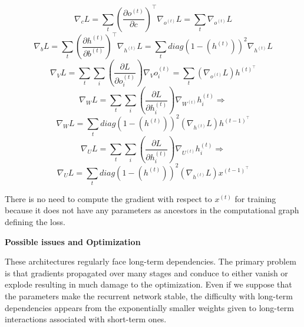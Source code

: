 \begin{equation}
    \nabla_c L = \sum_t (\frac{\partial o^{(t)}}{\partial c})^\top \nabla_{o^{(t)}} L = \sum_t \nabla_{o^{(t)}} L\label{eq:equation15}
\end{equation}
\begin{equation}
    \nabla_b L = \sum_t (\frac{\partial h^{(t)}}{\partial b^{(t)}})^\top \nabla_{h^{(t)}} L = \sum_t diag(1-(h^{(t)}))^2 \nabla_{h^{(t)}} L\label{eq:equation16}
\end{equation}
\begin{equation}
    \nabla_V L = \sum_t \sum_i (\frac{\partial L}{\partial o^{(t)}_i}) \nabla_V o^{(t)}_i = \sum_t (\nabla_{o^{(t)}} L) h^{(t)^\top}\label{eq:equation17}
\end{equation}
\begin{equation}
    \nabla_W L = \sum_t \sum_i (\frac{\partial L}{\partial h^{(t)}_i}) \nabla_{W^{(t)}} h^{(t)}_i \Rightarrow\label{eq:equation18}
\end{equation}
\begin{equation}
    \nabla_W L = \sum_t diag(1-(h^{(t)}))^2 (\nabla_{h^{(t)}} L) h^{(t-1)^\top}\label{eq:equation19}
\end{equation}
\begin{equation}
    \nabla_U L = \sum_t \sum_i (\frac{\partial L}{\partial h^{(t)}_i}) \nabla_{U^{(t)}} h^{(t)}_i \Rightarrow\label{eq:equation20}
\end{equation}
\begin{equation}
    \nabla_U L = \sum_t diag(1-(h^{(t)}))^2 (\nabla_{h^{(t)}} L) x^{(t-1)^\top}\label{eq:equation21}
\end{equation}

There is no need to compute the gradient with respect to $x^{(t)}$ for training because
it does not have any parameters as ancestors in the computational graph defining
the loss.

\newpage

{\large \textbf{Possible issues and Optimization}}

These architectures regularly face long-term dependencies.
The primary problem is that gradients propagated over many stages and conduce to either vanish or explode resulting in much damage to the optimization.
Even if we suppose that the parameters make the recurrent network stable,
the difficulty with long-term dependencies appears from the exponentially smaller weights given to long-term interactions associated with short-term ones.

